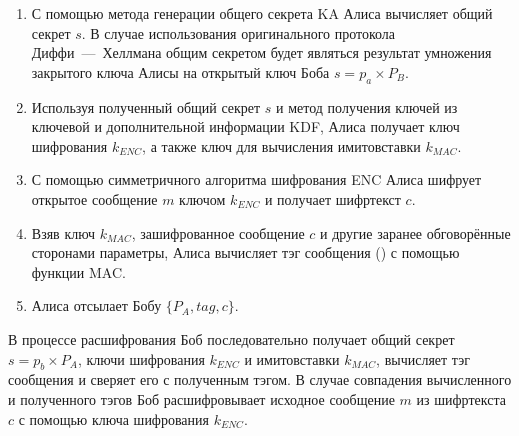 \begin{enumerate}
	\item С помощью метода генерации общего секрета KA Алиса вычисляет общий секрет $s$. В случае использования оригинального протокола Диффи~---~Хеллмана общим секретом будет являться результат умножения закрытого ключа Алисы на открытый ключ Боба $s = p_a \times P_B$.
	\item Используя полученный общий секрет $s$ и метод получения ключей из ключевой и дополнительной информации KDF, Алиса получает ключ шифрования $k_{ENC}$, а также ключ для вычисления имитовставки $k_{MAC}$.
	\item С помощью симметричного алгоритма шифрования ENC Алиса шифрует открытое сообщение $m$ ключом $k_{ENC}$ и получает шифртекст $c$.
	\item Взяв ключ $k_{MAC}$, зашифрованное сообщение $c$ и другие заранее обговорённые сторонами параметры, Алиса вычисляет тэг сообщения () с помощью функции MAC.
	\item Алиса отсылает Бобу $\{P_A, tag, c\}$.
\end{enumerate}

В процессе расшифрования Боб последовательно получает общий секрет $s = p_b \times P_A$, ключи шифрования $k_{ENC}$ и имитовставки $k_{MAC}$, вычисляет тэг сообщения и сверяет его с полученным тэгом. В случае совпадения вычисленного и полученного тэгов Боб расшифровывает исходное сообщение $m$ из шифртекста $c$ с помощью ключа шифрования $k_{ENC}$.
